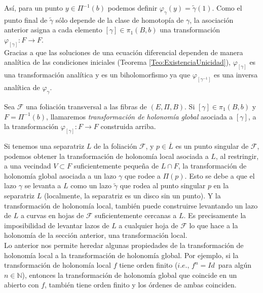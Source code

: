 Así, para un punto $y\in\Pi^{-1}(b)$ podemos definir $\varphi_{\gamma}(y)=\tilde{\gamma}(1)$. Como el punto final de $\tilde{\gamma}$ sólo depende de la clase de homotopía de $\gamma$, la asociación anterior asigna a cada elemento $[\gamma]\in\pi_{1}(B,b)$ una transformación $\varphi_{[\gamma]}\colon F\rightarrow F$.\\

Gracias a que las soluciones de una ecuación diferencial dependen de manera analítica de las condiciones iniciales (Teorema \ref{Teo:ExistenciaUnicidad}), $\varphi_{[\gamma]}$ es una transformación analítica y es un biholomorfismo ya que $\varphi_{[\gamma^{-1}]}$ es una inversa analítica de $\varphi_{\gamma}$.\\

\begin{defn}
\label{Def:HolonomiaGlobal}
Sea $\mathcal{F}$ una foliación transversal a las fibras de $(E,\Pi,B)$. Si $[\gamma]\in\pi_{1}(B,b)$ y $F=\Pi^{-1}(b)$, llamaremos \emph{transformación de holonomía global} asociada a $[\gamma]$, a la transformación $\varphi_{[\gamma]}\colon F\rightarrow F$ construida arriba. 
\end{defn}

Si tenemos una separatriz $L$ de la foliación $\mathcal{F}$, y $p\in\overline{L}$ es un punto singular de $\mathcal{F}$, podemos obtener la transformación de holonomía local asociada a $L$, al restringir, a una vecindad $V\subset F$ suficientemente pequeña de $L\cap F$, la transformación de holonomía global asociada a un lazo $\gamma$ que rodee a $\Pi(p)$. Esto se debe a que el lazo $\gamma$ se levanta a $L$ como un lazo $\tilde{\gamma}$ que rodea al punto singular $p$ en la separatriz $L$ (localmente, la separatriz es un disco sin un punto). Y la transformación de holonomía local, también puede construirse levantando un lazo de $L$ a curvas en hojas de $\mathcal{F}$ suficientemente cercanas a $L$. Es precisamente la imposibilidad de levantar lazos de $L$ a cualquier hoja de $\mathcal{F}$ lo que hace a la holonomía de la sección anterior, una transformación local.\\

Lo anterior nos permite heredar algunas propiedades de la transformación de holonomía local a la transformación de holonomía global. Por ejemplo, si la transformación de holonomía local  $f$ tiene orden finito ($\mathit{i.e.},\, f^{n}=Id\,$ para algún $n\in\mathbb{N}$), entonces la transformación de holonomía global que coincide en un abierto con $f$, también tiene orden finito y los órdenes de ambas coinciden.\\

